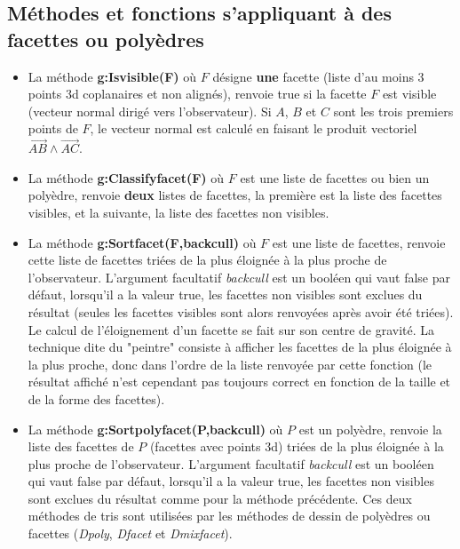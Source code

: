 \subsection{Méthodes et fonctions s'appliquant à des facettes ou polyèdres}

\begin{itemize}
    \item La méthode \textbf{g:Isvisible(F)} où $F$ désigne \textbf{une} facette (liste d'au moins 3 points 3d coplanaires et non alignés), renvoie true si la facette $F$ est visible (vecteur normal dirigé vers l'observateur). Si $A$, $B$ et $C$ sont les trois premiers points de $F$, le vecteur normal est calculé en faisant le produit vectoriel $\vec{AB}\wedge\vec{AC}$.
    
    \item La méthode \textbf{g:Classifyfacet(F)} où $F$ est une liste de facettes ou bien un polyèdre, renvoie \textbf{deux} listes de facettes, la première est la liste des facettes visibles, et la suivante, la liste des facettes non visibles.
    
    \item La méthode \textbf{g:Sortfacet(F,backcull)} où $F$ est une liste de facettes, renvoie cette liste de facettes triées de la plus éloignée à la plus proche de l'observateur. L'argument facultatif \emph{backcull} est un booléen qui vaut false par défaut, lorsqu'il a la valeur true, les facettes non visibles sont exclues du résultat (seules les facettes visibles sont alors renvoyées après avoir été triées). Le calcul de l'éloignement d'un facette se fait sur son centre de gravité. La technique dite du "peintre" consiste à afficher les facettes de la plus éloignée à la plus proche, donc dans l'ordre de la liste renvoyée par cette fonction (le résultat affiché n'est cependant pas toujours correct en fonction de la taille et de la forme des facettes).
    
    \item La méthode \textbf{g:Sortpolyfacet(P,backcull)} où $P$ est un polyèdre, renvoie la liste des facettes de $P$ (facettes avec points 3d) triées de la plus éloignée à la plus proche de l'observateur. L'argument facultatif \emph{backcull} est un booléen qui vaut false par défaut, lorsqu'il a la valeur true, les facettes non visibles sont exclues du résultat comme pour la méthode précédente. Ces deux méthodes de tris sont utilisées par les méthodes de dessin de polyèdres ou facettes (\emph{Dpoly}, \emph{Dfacet} et \emph{Dmixfacet}).
    

\end{itemize}
